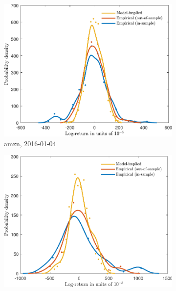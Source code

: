 \documentclass[11pt, a4paper]{thesis}  %
\begin{document}
\begin{figure}[H]	

	\centering	
    \begin{subfigure}[b]{0.5\textwidth}
        \centering
        \includegraphics[width=\textwidth]{./SignaturePlot/AMZN/20160104/log_return_distribution.pdf}
        \caption{\ac{amzn}, 2016-01-04}
        \label{figure:results:log_distribution:amzn:20160104}
    \end{subfigure}
    \vfill
    \begin{subfigure}[b]{0.5\textwidth}
        \centering
        \includegraphics[width=\textwidth]{./SignaturePlot/NFLX/20160115/log_return_distribution.pdf}

\end{subfigure}
\end{figure}
\end{document}
